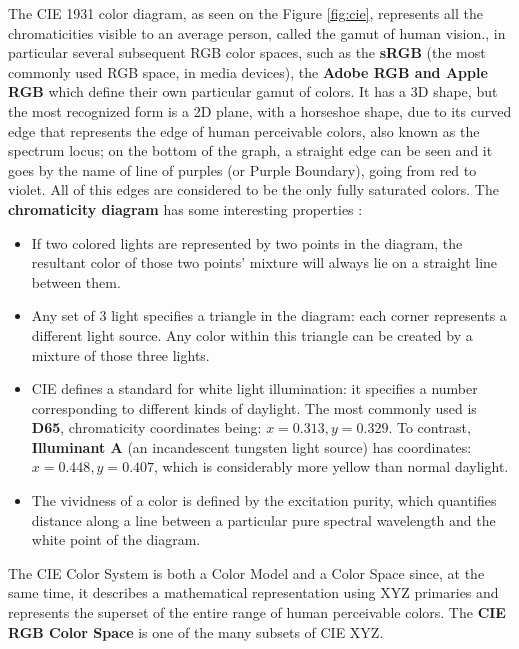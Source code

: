 %
The CIE 1931 color diagram, as seen on the Figure \ref{fig:cie}, represents all the chromaticities visible to an average
person, called the gamut of human vision., in particular several subsequent RGB color spaces, such as the \textbf{sRGB}
(the most commonly used RGB space, in media devices), the \textbf{Adobe RGB and Apple RGB} which define their own
particular gamut of colors. It has a 3D shape, but the most recognized form is a 2D plane, with a
horseshoe shape, due to its curved edge that represents the edge of human perceivable colors, also known as the
spectrum locus; on the bottom of the graph, a
straight edge can be seen and it goes by the name of line of purples (or Purple Boundary), going from red to violet. All of this
edges are considered to be the only fully saturated colors. The \textbf{chromaticity diagram} has some
interesting properties \cite{Ware2012}:
%
\begin{itemize}
	\setlength\itemsep{0.01em}
  \item If two colored lights are represented by two points in the diagram, the resultant color of those
  two points’ mixture will always lie on a straight line between them.
  \item Any set of 3 light specifies a triangle in the diagram: each corner represents a different light
  source. Any color within this triangle can be created by a mixture of those three lights.
  \item CIE defines a standard for white light illumination: it specifies a number corresponding to
  different kinds of daylight. The most commonly used is \textbf{D65}, chromaticity coordinates being: $x = 0.313 , y = 0.329$.
  To contrast, \textbf{Illuminant A} (an incandescent tungsten light source) has coordinates: $x = 0.448 , y = 0.407$,
  which is considerably more yellow than normal daylight.
  \item The vividness of a color is defined by the excitation purity, which quantifies
  distance along a line between a particular pure spectral wavelength and the white point of the diagram.
\end{itemize} \par
%
The CIE Color System is both a Color Model and a Color Space since, at the same time, it describes
a mathematical representation using XYZ primaries and represents the superset of the entire range of human
perceivable colors. The \textbf{CIE RGB Color Space} is one of the many subsets of CIE XYZ. \par
%
